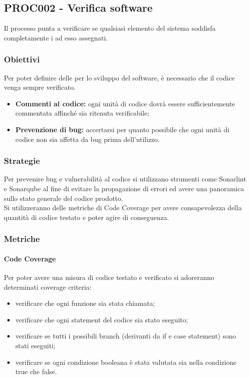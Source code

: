 \documentclass[PianoDiQualifica.tex]{subfiles}
\begin{document}
\subsection{PROC002 - Verifica software}
Il processo punta a verificare se qualsiasi elemento del sistema soddisfa completamente i  ad esso assegnati.
\subsubsection{Obiettivi}
Per poter definire delle  per lo sviluppo del software, è necessario che il codice venga sempre verificato.
 \begin{itemize}
 	\item \textbf{Commenti al codice:} ogni unità di codice dovrà essere sufficientemente commentata affinché sia ritenuta verificabile;
 	\item \textbf{Prevenzione di bug:} accertarsi per quanto possibile che ogni unità di codice non sia affetta da bug prima dell'utilizzo.
 \end{itemize}
\subsubsection{Strategie}
Per prevenire bug e vulnerabilità al codice si utilizzano strumenti come Sonarlint e Sonarqube al fine di evitare la propagazione di errori ed avere una panoramica sullo stato generale del codice prodotto.\\
Si utilizzeranno delle metriche di Code Coverage per avere consapevolezza della quantità di codice testato e poter agire di conseguenza.
 
\subsubsection{Metriche}
\paragraph{Code Coverage}
Per poter avere una misura di codice testato e verificato si adoreranno determinati coverage criteria:
\begin{itemize}
	\item {} verificare che ogni funzione sia stata chiamata;
	\item {} verificare che ogni statement del codice sia stato eseguito; 
	\item {} verificare se tutti i possibili branch (derivanti da if e case statement) sono stati eseguiti;
	\item {} verificare se ogni condizione booleana è stata valutata sia nella condizione true che false. 
\end{itemize}
\end{document}
